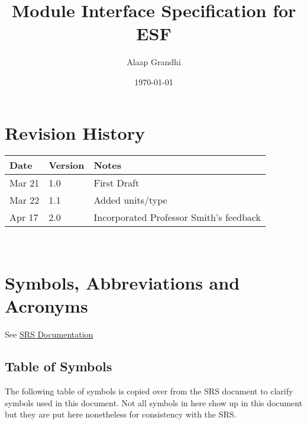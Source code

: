 \documentclass[12pt, titlepage]{article}
\newcommand{\ProjectName}{ESF}
\begin{document}
\title{Module Interface Specification for \ProjectName{}}

\author{Alaap Grandhi}

\date{\today}

\maketitle


\section{Revision History}

\begin{tabularx}{\textwidth}{p{3cm}p{2cm}X}
\toprule {\bf Date} & {\bf Version} & {\bf Notes}\\
\midrule
Mar 21 & 1.0 & First Draft\\
Mar 22 & 1.1 & Added units/type\\
Apr 17 & 2.0 & Incorporated Professor Smith's feedback \\
\bottomrule
\end{tabularx}

~\newpage

\section{Symbols, Abbreviations and Acronyms}

See \href{https://github.com/alaapgrandhi/equivariant-sensor-fusion/tree/main/docs/SRS}{SRS Documentation} 

\subsection{Table of Symbols}

The following table of symbols is copied over from the SRS document to clarify symbols used in this document. Not all symbols in here show up in this document but they are put here nonetheless for consistency with the SRS.
\end{document}
